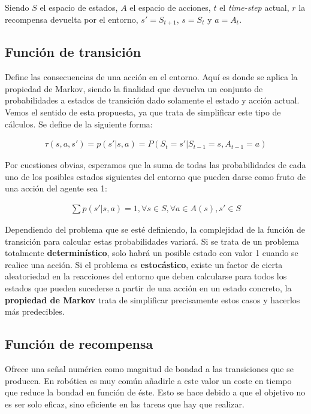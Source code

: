\documentclass[11pt,fleqn]{book} %
\begin{document}
Siendo $S$ el espacio de estados, $A$ el espacio de acciones, $t$ el \textit{time-step} actual, $r$ la recompensa devuelta por el entorno, $s'=S_{t+1}$, $s=S_t$ y $a=A_t$. \\

\subsection{Función de transición}

Define las consecuencias de una acción en el entorno. Aquí es donde se aplica la propiedad de Markov, siendo la finalidad que devuelva un conjunto de probabilidades a estados de transición dado solamente el estado y acción actual. Vemos el sentido de esta propuesta, ya que trata de simplificar este tipo de cálculos. Se define de la siguiente forma:

\begin{align*}
\tau(s,a,s')=p(s'|s,a)=P(S_t=s'|S_{t-1}=s,A_{t-1}=a)
\end{align*}

Por cuestiones obvias, esperamos que la suma de todas las probabilidades de cada uno de los posibles estados siguientes del entorno que pueden darse como fruto de una acción del agente sea 1:

\begin{align*}
\sum{p(s'|s,a)=1, \forall s \in S, \forall a \in A(s), s' \in S}
\end{align*}

Dependiendo del problema que se esté definiendo, la complejidad de la función de transición para calcular estas probabilidades variará. Si se trata de un problema totalmente \textbf{determinístico}, solo habrá un posible estado con valor 1 cuando se realice una acción. Si el problema es \textbf{estocástico}, existe un factor de cierta aleatoriedad en la reacciones del entorno que deben calcularse para todos los estados que pueden sucederse a partir de una acción en un estado concreto, la \textbf{propiedad de Markov} trata de simplificar precisamente estos casos y hacerlos más predecibles. \\

\subsection{Función de recompensa}

Ofrece una señal numérica como magnitud de bondad a las transiciones que se producen. En robótica es muy común añadirle a este valor un coste en tiempo que reduce la bondad en función de éste. Esto se hace debido a que el objetivo no es ser solo eficaz, sino eficiente en las tareas que hay que realizar. \\
\end{document}
